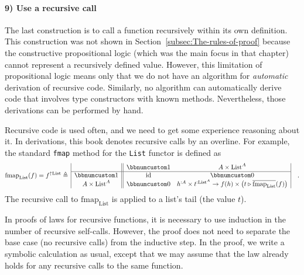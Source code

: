\paragraph{9) Use a recursive call}

The last construction is to call a function recursively within its
own definition. This construction was not shown in Section~\ref{subsec:The-rules-of-proof}
because the constructive propositional logic (which was the main focus
in that chapter) cannot represent a recursively defined value. However,
this limitation of propositional logic means only that we do not have
an algorithm for \emph{automatic} derivation of recursive code. Similarly,
no algorithm can automatically derive code that involves type constructors
with known methods. Nevertheless, those derivations can be performed
by hand. 

Recursive code is used often, and we need to get some experience reasoning
about it. In derivations, this book denotes recursive calls by an
overline. For example, the standard \lstinline!fmap! method for the
\lstinline!List! functor is defined as
\[
\text{fmap}_{\text{List}}(f)=f^{\uparrow\text{List}}\triangleq\,\begin{array}{|c||cc|}
 & \bbnum 1 & A\times\text{List}^{A}\\
\hline \bbnum 1 & \text{id} & \bbnum 0\\
A\times\text{List}^{A} & \bbnum 0 & h^{:A}\times t^{:\text{List}^{A}}\rightarrow f(h)\times\big(t\triangleright\overline{\text{fmap}_{\text{List}}}(f)\big)
\end{array}\quad.
\]
The recursive call to $\text{fmap}_{\text{List}}$ is applied to a
list\textsf{'}s tail (the value $t$).

In proofs of laws for recursive functions, it is necessary to use
induction in the number of recursive self-calls. However, the proof
does not need to separate the base case (no recursive calls) from
the inductive step. In the proof, we write a symbolic calculation
as usual, except that we may assume that the law already holds for
any recursive calls to the same function.

